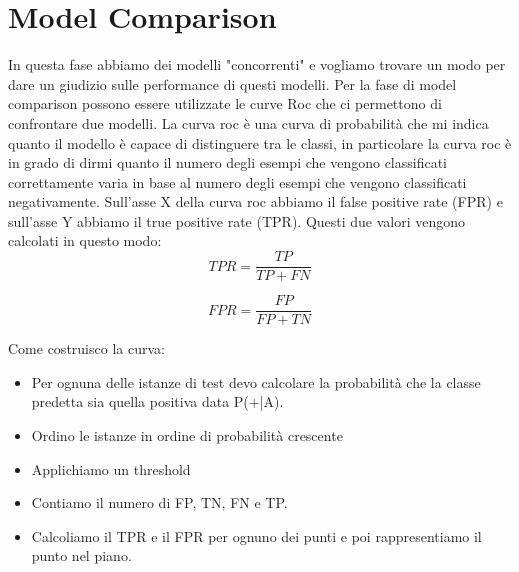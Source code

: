 \documentclass[14pt]{extreport}
\begin{document}
\section{Model Comparison}
In questa fase abbiamo dei modelli "concorrenti" e vogliamo trovare un modo per dare un giudizio sulle performance di questi modelli.
Per la fase di model comparison possono essere utilizzate le curve Roc che ci permettono di confrontare due modelli.
La curva roc è una curva di probabilità che mi indica quanto il modello è capace di distinguere tra le classi, in particolare la curva roc è in grado di dirmi quanto il numero degli esempi che vengono classificati correttamente varia in base al numero degli esempi che vengono classificati negativamente.
Sull'asse X della curva roc abbiamo il false positive rate (FPR) e sull'asse Y abbiamo il true positive rate (TPR).
Questi due valori vengono calcolati in questo modo:
\begin{equation}
TPR = \frac{TP}{TP+FN}
\end{equation}

\begin{equation}
FPR = \frac{FP}{FP+TN}
\end{equation}

Come costruisco la curva:
\begin{itemize}
\item Per ognuna delle istanze di test devo calcolare la probabilità che la classe predetta sia quella positiva data P(+|A).
\item Ordino le istanze in ordine di probabilità crescente
\item Applichiamo un threshold
\item Contiamo il numero di FP, TN, FN e TP.
\item Calcoliamo il TPR e il FPR per ognuno dei punti e poi rappresentiamo il punto nel piano.
\end{itemize}
\end{document}
